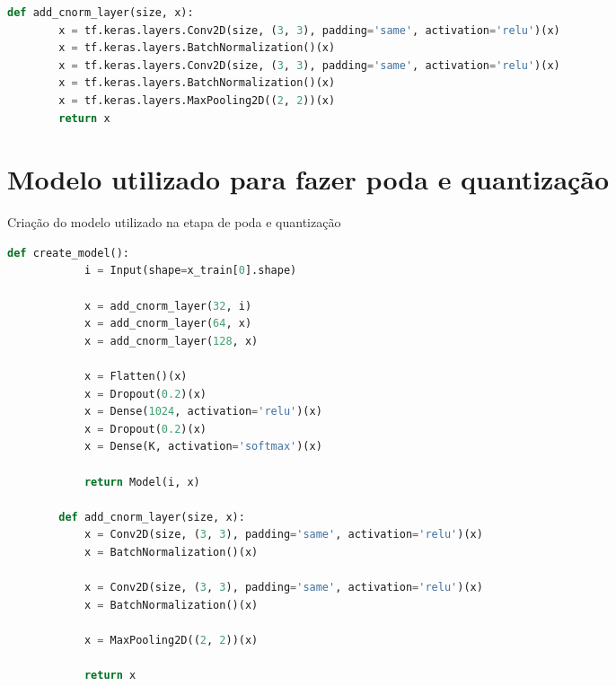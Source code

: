 \begin{apendicesenv}
\begin{codigo}[!htb]
\begin{lstlisting}[language = python]
	def add_cnorm_layer(size, x):
		x = tf.keras.layers.Conv2D(size, (3, 3), padding='same', activation='relu')(x)
		x = tf.keras.layers.BatchNormalization()(x)
		x = tf.keras.layers.Conv2D(size, (3, 3), padding='same', activation='relu')(x)
		x = tf.keras.layers.BatchNormalization()(x)
		x = tf.keras.layers.MaxPooling2D((2, 2))(x)
		return x
    \end{lstlisting}
\end{codigo}


\chapter{Modelo utilizado para fazer poda e quantização}\label{apendice_pruning_quantization}

\begin{codigo}[!htb]
    \caption{Criação do modelo utilizado na etapa de poda e quantização}
    \label{pruning_quantization_model}
    \begin{lstlisting}[language = python]
	    def create_model():
		    i = Input(shape=x_train[0].shape)

		    x = add_cnorm_layer(32, i)
		    x = add_cnorm_layer(64, x)
		    x = add_cnorm_layer(128, x)

		    x = Flatten()(x)
		    x = Dropout(0.2)(x)
		    x = Dense(1024, activation='relu')(x)
		    x = Dropout(0.2)(x)
		    x = Dense(K, activation='softmax')(x)

		    return Model(i, x)

	    def add_cnorm_layer(size, x):
		    x = Conv2D(size, (3, 3), padding='same', activation='relu')(x)
		    x = BatchNormalization()(x)

		    x = Conv2D(size, (3, 3), padding='same', activation='relu')(x)
		    x = BatchNormalization()(x)

		    x = MaxPooling2D((2, 2))(x)

		    return x
    \end{lstlisting}
\end{codigo}

\end{apendicesenv}
